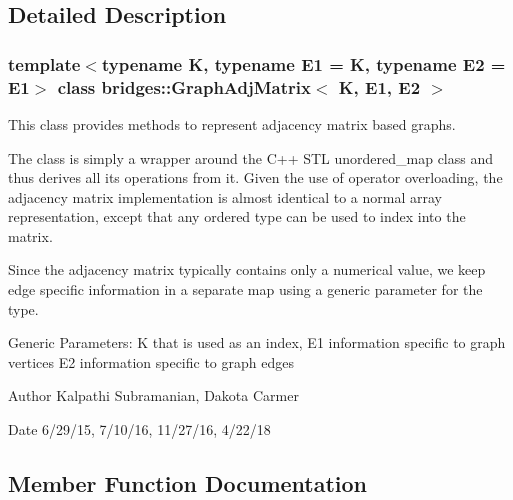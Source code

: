 \subsection{Detailed Description}
\subsubsection*{template$<$typename K, typename E1 = K, typename E2 = E1$>$\newline
class bridges\+::\+Graph\+Adj\+Matrix$<$ K, E1, E2 $>$}

This class provides methods to represent adjacency matrix based graphs. 

The class is simply a wrapper around the C++ S\+TL unordered\+\_\+map class and thus derives all its operations from it. Given the use of operator overloading, the adjacency matrix implementation is almost identical to a normal array representation, except that any ordered type can be used to index into the matrix.

Since the adjacency matrix typically contains only a numerical value, we keep edge specific information in a separate map using a generic parameter for the type.

Generic Parameters\+: K that is used as an index, E1 information specific to graph vertices E2 information specific to graph edges

\begin{DoxyAuthor}{Author}
Kalpathi Subramanian, Dakota Carmer 
\end{DoxyAuthor}
\begin{DoxyDate}{Date}
6/29/15, 7/10/16, 11/27/16, 4/22/18 
\end{DoxyDate}


\subsection{Member Function Documentation}
\mbox{\label{classbridges_1_1_graph_adj_matrix_a785f15a8ca7857a72c34e51ae0c24834}} 
